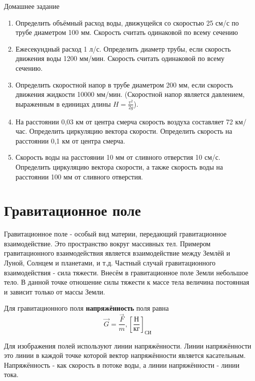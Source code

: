 \documentclass[a5paper, 10pt]{diss_4}
\renewcommand{\'}{\,'}
\begin{document}
\begin{center}
   Домашнее задание
\end{center}
\begin{enumerate}
\item Определить объёмный расход воды, движущейся со
скоростью 25 см/с по трубе диаметром 100 мм. Скорость
считать одинаковой по всему сечению

\item Ежесекундный расход 1 л/с. Определить диаметр трубы,
если скорость движения воды 1200 мм/мин. Скорость считать
одинаковой по всему сечению.

\item Определить скоростной напор в трубе диаметром 200 мм,
если скорость движения жидкости 10000 мм/мин. (Скоростной напор
является давлением, выраженным в единицах длины $H=\frac{v^2}{2g}$).

\item На расстоянии 0,03 км от центра смерча скорость воздуха
составляет 72 км/час. Определить циркуляцию вектора скорости.
Определить скорость на расстоянии 0,1 км от центра смерча.

\item Скорость воды на расстоянии 10 мм от сливного отверстия
10 см/с. Определить циркуляцию вектора скорости, а также скорость воды на
 расстоянии 100 мм от сливного отверстия.
\end{enumerate}


\section{Гравитационное поле}

  Гравитационное поле - особый вид материи, передающий гравитационное
взаимодействие. Это пространство вокруг массивных тел. Примером гравитационного
взаимодействия является взаимодействие между Землёй и Луной, Солнцем и
планетами, и т.д. Частный случай гравитационного взаимодействия - сила тяжести.
Внесём в гравитационное поле Земли небольшое тело. В данной точке отношение
силы тяжести к массе тела величина постоянная и зависит только от массы Земли.

Для гравитационного поля \textbf{напряжённость} поля равна
\[
\vec{G}=\frac{\vec{F}}{m},{\left[\frac{Н}{кг}\right]}_{СИ}
\]

  Для изображения полей используют линии напряжённости. Линии напряжённости
это линии в каждой точке которой вектор напряжённости является касательным.
Напряжённость - как скорость в потоке воды, а линии напряжённости - линии тока.
\end{document}
